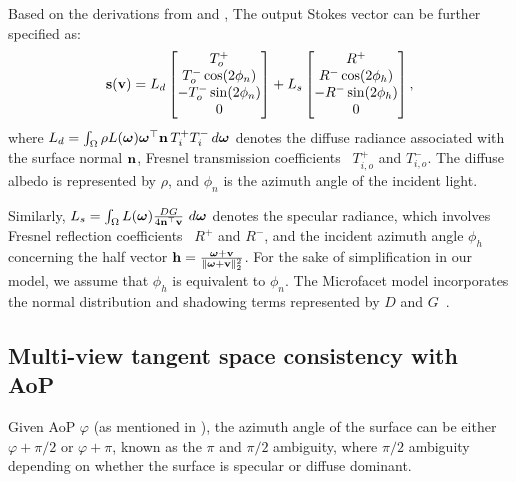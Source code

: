 Based on the derivations from \pandora and \nersp, The output Stokes vector can be 
further specified as:
\begin{eqnarray}
    \mathbf{s}(\mathbf{v}) =   L_d \begin{bmatrix}
        T_o^+ \\
        T_o^- \cos(2 \phi_n) \\
        - T_o^- \sin(2 \phi_n) \\
        0
    \end{bmatrix} +  L_s \begin{bmatrix}
        R^+ \\
        R^- \cos(2 \phi_h) \\
        -R^- \sin(2 \phi_h) \\
        0
    \end{bmatrix},
    \label{eq:photometric_cue}
\end{eqnarray}
where $L_d = \int_{\Omega} \rho L(\bm{\omega})  \bm{\omega}^\top \mathbf{n} \, T_i^+T_i^-   \, d\bm{\omega}$ 
denotes the diffuse radiance associated with the surface normal $\mathbf{n}$, 
Fresnel transmission coefficients~\citep{baek2018simultaneous} $T_{i, o}^+$ and 
$T_{i, o}^-$. The diffuse albedo is represented by $\rho$, and $\phi_n$
is the azimuth angle of the incident light. 

Similarly, $L_s = \int_{\Omega} L(\bm{\omega})  \frac{DG}{4 \mathbf{n}^\top\mathbf{v}}   \,\, d\bm{\omega}$ 
denotes the specular radiance, which involves Fresnel reflection coefficients~\citep{baek2018simultaneous} 
$R^+$ and $R^-$, and the incident azimuth angle $\phi_h$ concerning the half vector 
$\mathbf{h} = \frac{\bm{\omega} + \mathbf{v}}{\|\bm{\omega} + \mathbf{v}\|_2^2}$. For the sake of simplification in our model, we assume that $\phi_h$
is equivalent to $\phi_n$. The Microfacet model incorporates the normal distribution and shadowing terms represented by 
$D$ and $G$~\citep{walter2007microfacet}. 

\subsection{Multi-view tangent space consistency with AoP}
Given AoP $\varphi$ (as mentioned in ), the azimuth angle of the surface can be either $\varphi + \pi /2$ or $\varphi + \pi$, known as the $\pi$ and $\pi / 2$ ambiguity, where $\pi / 2$ ambiguity depending on whether the surface is specular or diffuse dominant.

